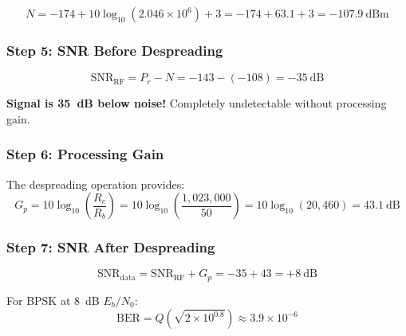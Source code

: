 \begin{equation}
N = -174 + 10\log_{10}(2.046 \times 10^6) + 3 = -174 + 63.1 + 3 = -107.9~\text{dBm}
\end{equation}

\subsubsection*{Step 5: SNR Before Despreading}

\begin{equation}
\text{SNR}_{\text{RF}} = P_r - N = -143 - (-108) = -35~\text{dB}
\end{equation}

\textbf{Signal is 35~dB below noise!} Completely undetectable without processing gain.

\subsubsection*{Step 6: Processing Gain}

The despreading operation provides:
\begin{equation}
G_p = 10\log_{10}\left(\frac{R_c}{R_b}\right) = 10\log_{10}\left(\frac{1{,}023{,}000}{50}\right) = 10\log_{10}(20{,}460) = 43.1~\text{dB}
\end{equation}

\subsubsection*{Step 7: SNR After Despreading}

\begin{equation}
\text{SNR}_{\text{data}} = \text{SNR}_{\text{RF}} + G_p = -35 + 43 = +8~\text{dB}
\end{equation}

For BPSK at 8~dB $E_b/N_0$:
\begin{equation}
\text{BER} = Q\left(\sqrt{2 \times 10^{0.8}}\right) \approx 3.9 \times 10^{-6}
\end{equation}

